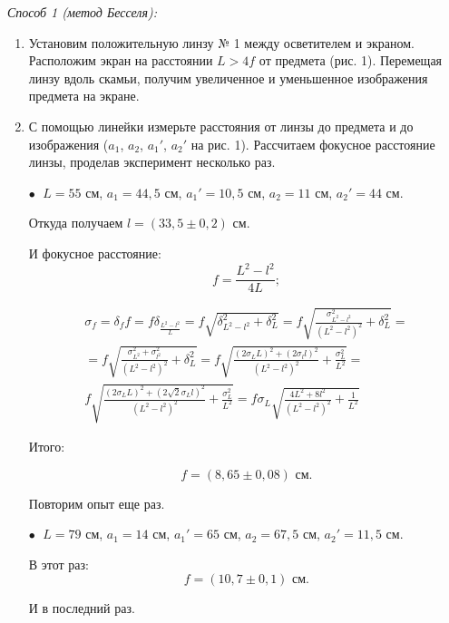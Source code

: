\documentclass[a4paper,12pt]{article} %
\begin{document}
	\textit{Способ 1 (метод Бесселя):}
	\begin{enumerate}
		\item Установим положительную линзу № 1 между осветителем и экраном. Расположим экран на расстоянии $L > 4f$ от предмета (рис. 1). Перемещая линзу вдоль скамьи, получим увеличенное и уменьшенное изображения предмета на экране.
		
		\item С помощью линейки измерьте расстояния от линзы до предмета и до изображения ($a_1$, $a_2$, $a_1'$, $a_2'$ на рис. 1). Рассчитаем фокусное расстояние линзы, проделав эксперимент несколько раз.
		
		$\bullet \;$ $L = 55$ см, $a_1 = 44,5$ см, $a_1' = 10,5$ см, $a_2 = 11$ см, $a_2' = 44$ см.
		
		Откуда получаем $l = (33,5 \pm 0,2)$ см.
		
		И фокусное расстояние:
		\begin{equation*}
			f = \frac{L^2 - l^2}{4L};
		\end{equation*}
	
		\begin{eqnarray*}
			\sigma_f = \delta_f f = f \delta_{\frac{L^2 - l^2}{L}} = f \sqrt{\delta_{L^2 - l^2}^2 + \delta_L^2} = f\sqrt{\frac{\sigma_{L^2 - l^2}^2}{(L^2 - l^2)^2} + \delta_L^2} = \\
			 = f\sqrt{\frac{\sigma_{L^2}^2 + \sigma_{l^2}^2}{(L^2 - l^2)^2} + \delta_L^2} = f\sqrt{\frac{(2\sigma_{L}L)^2 + (2\sigma_{l}l)^2}{(L^2 - l^2)^2} + \frac{\sigma_L^2}{L^2}} = \\ 
			 f\sqrt{\frac{(2\sigma_{L}L)^2 + (2\sqrt{2}\sigma_{L}l)^2}{(L^2 - l^2)^2} + \frac{\sigma_L^2}{L^2}}
			 = f \sigma_L \sqrt{\frac{4L^2 + 8l^2}{(L^2 - l^2)^2} + \frac{1}{L^2}}
		\end{eqnarray*}
		
		Итого:
		
		\begin{equation*}
			f = (8,65 \pm 0,08) \text{ см}.
		\end{equation*}
		
		Повторим опыт еще раз.
		
		$\bullet \;$ $L = 79$ см, $a_1 = 14$ см, $a_1' = 65$ см, $a_2 = 67,5$ см, $a_2' = 11,5$ см.
		
		В этот раз:
		\begin{equation*}
			f = (10,7 \pm 0,1) \text{ см}.
		\end{equation*}
	
		И в последний раз.
		

\end{enumerate}
\end{document}
